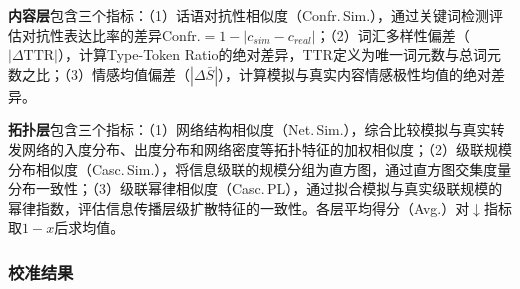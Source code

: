 \documentclass[lettersize,journal]{IEEEtran}
\begin{document}
\textbf{内容层}包含三个指标：（1）话语对抗性相似度（Confr.\,Sim.），通过关键词检测评估对抗性表达比率的差异$\text{Confr.} = 1 - |c_{sim} - c_{real}|$；（2）词汇多样性偏差（$|\Delta\text{TTR}|$），计算Type-Token Ratio的绝对差异，TTR定义为唯一词元数与总词元数之比；（3）情感均值偏差（$|\Delta\bar{S}|$），计算模拟与真实内容情感极性均值的绝对差异。

\textbf{拓扑层}包含三个指标：（1）网络结构相似度（Net.\,Sim.），综合比较模拟与真实转发网络的入度分布、出度分布和网络密度等拓扑特征的加权相似度；（2）级联规模分布相似度（Casc.\,Sim.），将信息级联的规模分组为直方图，通过直方图交集度量分布一致性；（3）级联幂律相似度（Casc.\,PL），通过拟合模拟与真实级联规模的幂律指数，评估信息传播层级扩散特征的一致性。各层平均得分（Avg.）对$\downarrow$指标取$1{-}x$后求均值。

\subsubsection{校准结果}
\end{document}
